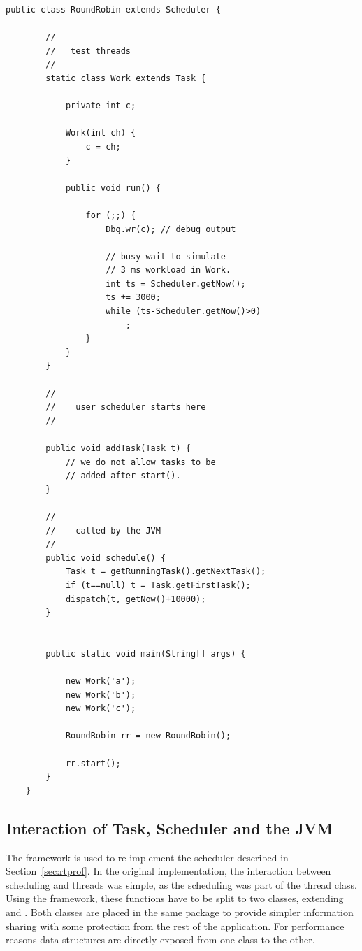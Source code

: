 \pagebreak
\begin{lstlisting}[caption=A very simple scheduler,
label=lst:arch:rt:user:example]
    public class RoundRobin extends Scheduler {

        //
        //   test threads
        //
        static class Work extends Task {

            private int c;

            Work(int ch) {
                c = ch;
            }

            public void run() {

                for (;;) {
                    Dbg.wr(c); // debug output

                    // busy wait to simulate
                    // 3 ms workload in Work.
                    int ts = Scheduler.getNow();
                    ts += 3000;
                    while (ts-Scheduler.getNow()>0)
                        ;
                }
            }
        }

        //
        //    user scheduler starts here
        //

        public void addTask(Task t) {
            // we do not allow tasks to be
            // added after start().
        }

        //
        //    called by the JVM
        //
        public void schedule() {
            Task t = getRunningTask().getNextTask();
            if (t==null) t = Task.getFirstTask();
            dispatch(t, getNow()+10000);
        }


        public static void main(String[] args) {

            new Work('a');
            new Work('b');
            new Work('c');

            RoundRobin rr = new RoundRobin();

            rr.start();
        }
    }
\end{lstlisting}


\subsection{Interaction of Task, Scheduler and the JVM}

The framework is used to re-implement the scheduler described in
Section~\ref{sec:rtprof}. In the original implementation, the
interaction between scheduling and threads was simple, as the
scheduling was part of the thread class. Using the framework, these
functions have to be split to two classes, extending  and
. Both classes are placed in the same package to
provide simpler information sharing with some protection from the
rest of the application. For performance reasons data structures are
directly exposed from one class to the other.

